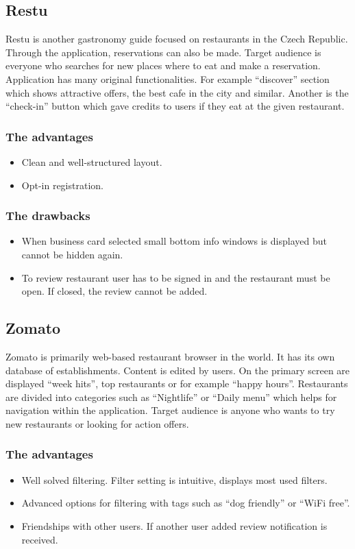 \subsection{Restu}
 Restu is another gastronomy guide focused on restaurants in the Czech Republic.  Through the application, reservations can also be made.
Target audience is everyone who searches for new places where to eat and make a reservation. 
Application has many original functionalities. For example ``discover'' section which shows attractive offers, the best cafe in the city and similar. Another is the ``check-in'' button which gave credits to users if they eat at the given restaurant.

\subsubsection{The advantages}
\begin{itemize}
    \item Clean and well-structured layout.
    \item Opt-in registration.
\end{itemize}

\subsubsection{The drawbacks}
\begin{itemize}
    \item When business card selected small bottom info windows is displayed but cannot be hidden again.
    \item To review restaurant user has to be signed in and the restaurant must be open. If closed, the review cannot be added.
\end{itemize}

\subsection{Zomato}
 Zomato is primarily web-based restaurant browser in the world. It has its own database of establishments. Content is edited by users.  
On the primary screen are displayed ``week hits'', top restaurants or for example ``happy hours''. Restaurants are divided into categories such as ``Nightlife'' or ``Daily menu'' which helps for navigation within the application.
Target audience is anyone who wants to try new restaurants or looking for action offers. 

\subsubsection{The advantages}
\begin{itemize}
    \item Well solved filtering. Filter setting is intuitive, displays most used filters. 
    \item Advanced options for filtering with tags such as ``dog friendly'' or ``WiFi free''.
    \item Friendships with other users. If another user added review notification is received.
\end{itemize}

